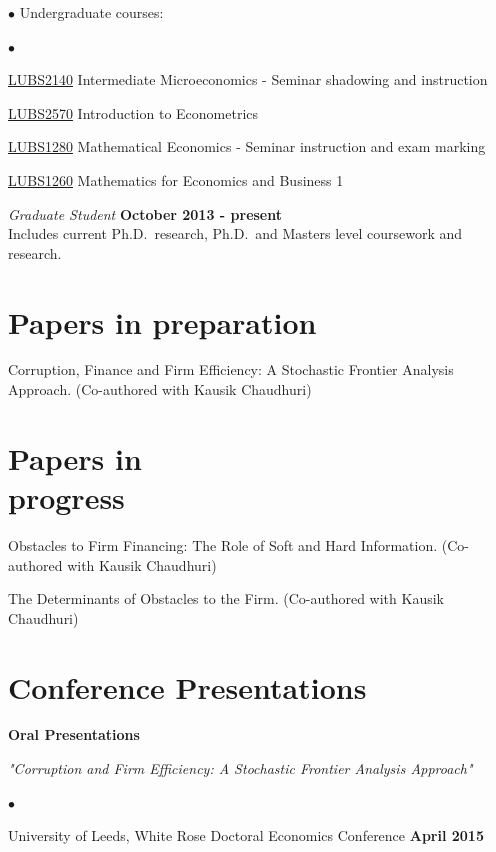 \documentclass[margin,line]{res}
\newenvironment{list1}{
  \begin{list}{\ding{113}}{%
      \setlength{\itemsep}{0in}
      \setlength{\parsep}{0in} \setlength{\parskip}{0in}
      \setlength{\topsep}{0in} \setlength{\partopsep}{0in} 
      \setlength{\leftmargin}{0.17in}}}{\end{list}}
\newenvironment{list2}{
  \begin{list}{$\bullet$}{%
      \setlength{\itemsep}{0in}
      \setlength{\parsep}{0in} \setlength{\parskip}{0in}
      \setlength{\topsep}{0in} \setlength{\partopsep}{0in} 
      \setlength{\leftmargin}{0.2in}}}{\end{list}}
\begin{document}
\begin{resume}
\begin{list2}
Undergraduate courses:\\
\vspace*{-.1in}
\begin{list2}
\item \href{http://webprod3.leeds.ac.uk/catalogue/dynmodules.asp?Y=201314&M=LUBS-2104}{LUBS2140} Intermediate Microeconomics - Seminar shadowing and instruction
\item \href{http://webprod3.leeds.ac.uk/catalogue/dynmodules.asp?Y=201415&M=LUBS-2570}{LUBS2570} Introduction to Econometrics
\item \href{http://webprod3.leeds.ac.uk/catalogue/dynmodules.asp?Y=201415&M=LUBS-1260}{LUBS1280} Mathematical Economics - Seminar instruction and exam marking
\item \href{http://webprod3.leeds.ac.uk/catalogue/dynmodules.asp?Y=201415&M=LUBS-1280}{LUBS1260} Mathematics for Economics and Business 1
\end{list2}

{\em Graduate Student} \hfill {\bf October 2013 - present}\\
Includes current Ph.D.~research, Ph.D.~and Masters level coursework and
research.

\section{\sc Papers in preparation}

Corruption, Finance and Firm Efficiency: A Stochastic Frontier Analysis Approach. (Co-authored with Kausik Chaudhuri)

\section{\sc Papers in \\ progress}

Obstacles to Firm Financing: The Role of Soft and Hard Information. (Co-authored with Kausik Chaudhuri)

The Determinants of Obstacles to the Firm. (Co-authored with Kausik Chaudhuri)

\section{\sc Conference Presentations}
\textbf{Oral Presentations}
\vspace*{.05in} 
\begin{list1}
\item[] \textit{"Corruption and Firm Efficiency: A Stochastic Frontier Analysis Approach"}
\vspace*{.1in} 
\begin{list2}
\item University of Leeds, White Rose Doctoral Economics Conference \hfill \bf{April 2015}
\end{list2}
\end{list1}


\end{list2}
\end{resume}
\end{document}
